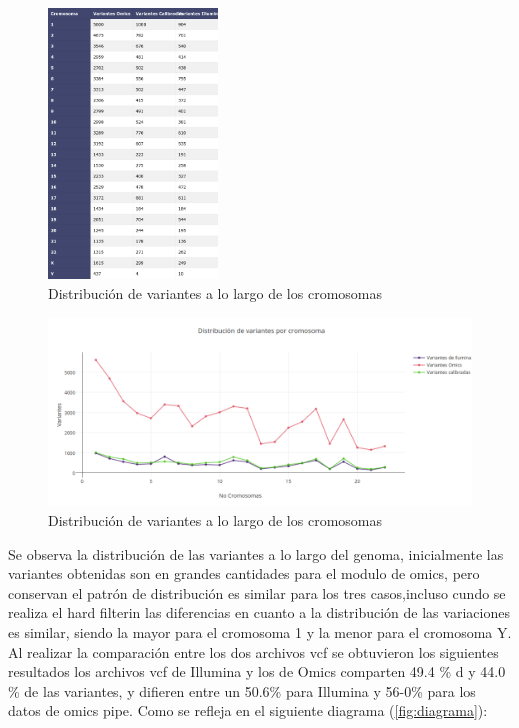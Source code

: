 \begin{figure}[H]
	\centering
	\includegraphics[width=0.4\textwidth]{Kap2/latex_table}
	\caption{Distribución de variantes a lo largo de los cromosomas} \label{fig:tabla1}
\end{figure}

\begin{figure}[H]
	\centering
	\includegraphics[width=1\textwidth]{Kap2/variaciones}
	\caption{Distribución de variantes a lo largo de los cromosomas} \label{fig:distribucion}
\end{figure}

Se observa la distribución de las variantes a lo largo del genoma, inicialmente las variantes obtenidas son en grandes cantidades para el modulo de omics, pero conservan el patrón de distribución es similar para los tres casos,incluso cundo se realiza el hard filterin las diferencias en cuanto a la distribución de las variaciones es similar, siendo la mayor para el cromosoma 1 y la menor para el cromosoma Y. \\

Al realizar la comparación entre los dos archivos vcf se obtuvieron los siguientes resultados los archivos vcf de Illumina y los de Omics comparten 49.4 \% d y 44.0 \% de las variantes, y difieren entre un 50.6\% para Illumina y 56-0\% para los datos de omics pipe. Como se refleja en el siguiente diagrama (\ref{fig:diagrama}):

